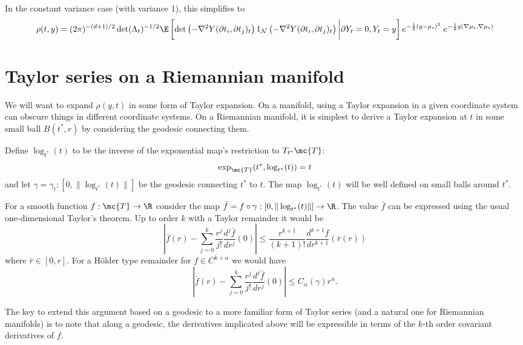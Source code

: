 \documentclass{article}
\begin{document}
In the constant variance case (with variance 1), this simplifies to
$$
\begin{aligned}
\rho(t,y) = (2\pi)^{-(d+1)/2} \det(\Lambda_t)^{-1/2} \E \left[\det\left(-\nabla^2 Y(\partial t_i, \partial t_j)_t\right) 1_{{\cal N}}\left(-\nabla^2 Y(\partial t_i, \partial t_j)_t \right) \biggl \vert \partial Y_t=0, Y_t=y\right] e^{-\frac{1}{2}(y-\mu_t)^2} \; e^{-\frac{1}{2}g(\nabla \mu_t,\nabla \mu_t)}
\end{aligned}
$$

\section{Taylor series on a Riemannian manifold}


We will want to expand $\rho(y,t)$ in some form of Taylor
expansion. On a manifold, using a Taylor expansion in a given
coordinate system can obscure things in different coordinate
systems. On a Riemannian manifold, it is simplest to derive a Taylor expansion
at $t$ in some small ball $B(t^*,r)$ by considering the geodesic connecting them.

Define $\log_{t^*}(t)$ to be the inverse of the exponential map's restriction to $T_{t^*}\mc{T}$:
$$
\exp_{\mc{T}}(t^*, \log_{t^*}(t)) = t
$$
and let $\gamma = \gamma_t:[0, \|\log_{t^*}(t)\|]$ be the geodesic connecting $t^*$ to $t$. The map $\log_{t^*}(t)$ will be well defined
on small balls around $t^*$.

For a smooth function $f:\mc{T} \rightarrow \R$ consider the map $\bar{f} = f \circ \gamma: [0, \|\log_{t^*}(t)\|] \rightarrow \R$.
The value $\bar{f}$ can be expressed using the usual one-dimensional Taylor's theorem. Up to order $k$ with a Taylor remainder it would be
$$
 \left|\bar{f}(r) - \sum_{j=0}^k \frac{r^j}{j!} \frac{d^j\bar{f}}{dr^j}(0) \right| \leq  \frac{r^{k+1}}{(k+1)!}\frac{d^{k+1}f}{dr^{k+1}} (\bar{r}(r))
$$
where $\bar{r} \in [0, r]$. For a H\"older type remainder for $f \in C^{k+\alpha}$ we would have
$$
 \left|\bar{f}(r) - \sum_{j=0}^k \frac{r^j}{j!} \frac{d^j\bar{f}}{dr^j}(0) \right| \leq  C_{\alpha}(\gamma) r^{\alpha}.
$$

 The key to extend this argument based on a geodesic to a more familiar form of Taylor series (and a natural one for Riemannian manifolds)
 is to note that along a geodesic, the derivatives implicated above will be expressible in terms of the $k$-th order covariant
 derivatives of $f$.
\end{document}

